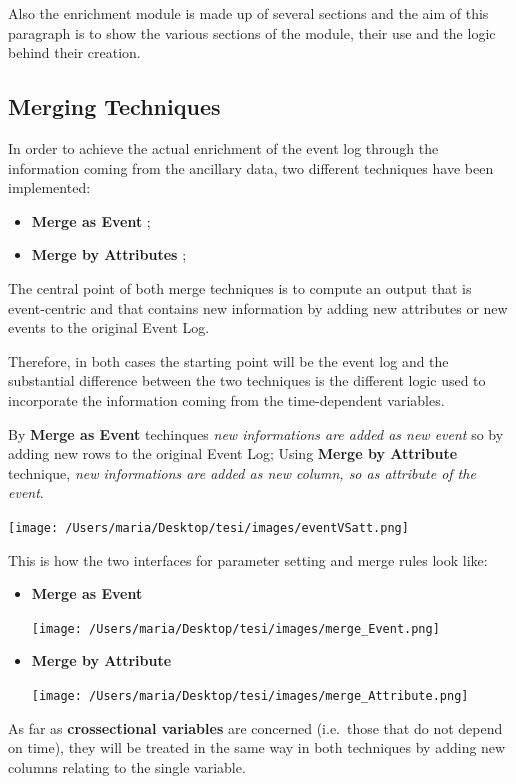 \documentclass[
]{book}
\providecommand{\tightlist}{%
  \setlength{\itemsep}{0pt}\setlength{\parskip}{0pt}}
\begin{document}
Also the enrichment module is made up of several sections and the aim of this paragraph is to show the various sections of the module, their use and the logic behind their creation.

\hypertarget{merging-techniques}{%
\subsection{Merging Techniques}\label{merging-techniques}}

In order to achieve the actual enrichment of the event log through the information coming from the ancillary data, two different techniques have been implemented:

\begin{itemize}
\tightlist
\item
  \textbf{Merge as Event} ;
\item
  \textbf{Merge by Attributes} ;
\end{itemize}

The central point of both merge techniques is to compute an output that is event-centric and that contains new information by adding new attributes or new events to the original Event Log.

Therefore, in both cases the starting point will be the event log and the substantial difference between the two techniques is the different logic used to incorporate the information coming from the time-dependent variables.

By \textbf{Merge as Event} techinques \emph{new informations are added as new event} so by adding new rows to the original Event Log; Using \textbf{Merge by Attribute} technique, \emph{new informations are added as new column, so as attribute of the event}.

\texttt{[image: /Users/maria/Desktop/tesi/images/eventVSatt.png]}

This is how the two interfaces for parameter setting and merge rules look like:

\begin{itemize}
\item
  \textbf{Merge as Event}

  \texttt{[image: /Users/maria/Desktop/tesi/images/merge\_Event.png]}
\item
  \textbf{Merge by Attribute}

  \texttt{[image: /Users/maria/Desktop/tesi/images/merge\_Attribute.png]}
\end{itemize}

As far as \textbf{crossectional variables} are concerned (i.e.~those that do not depend on time), they will be treated in the same way in both techniques by adding new columns relating to the single variable.
\end{document}
